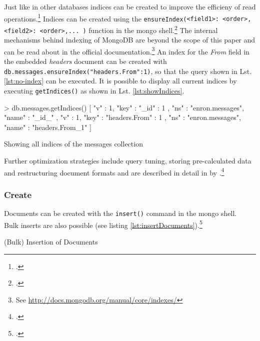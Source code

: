 Just like in other databases indices can be created to improve the efficieny of
read operations.\footcite[Cf.][152 et sq.]{Redmond_2012} Indices can be created
using the \texttt{ensureIndex({<field1>: <order>, <field2>: <order>,... })}
function in the mongo shell.\footcite[Cf.][12]{mongo_crud_manual} 
The internal mechanisms behind indexing of MongoDB are beyond the scope of this
paper and can be read about in the official documentation.\footnote{See
\url{http://docs.mongodb.org/manual/core/indexes/}} An index for the
\textit{From} field in the embedded \textit{headers} document can be created
with \texttt{db.messages.ensureIndex({"headers.From":1})}, so that the query
shown in Lst. \ref{lst:no-index} can be executed. It is possible to display all
current indices by executing \texttt{getIndices()} as shown in Lst.
\ref{lst:showIndices}.

\begin{listing}
    \begin{javascriptcode}
> db.messages.getIndices()
[   {
        "v" : 1,
        "key" : { "_id" : 1 },
        "ns" : "enron.messages",
        "name" : "_id_"
    },
    {
        "v" : 1,
        "key" : { "headers.From" : 1 },
        "ns" : "enron.messages",
        "name" : "headers.From_1"
    } ]
    \end{javascriptcode}
    \caption{Showing all indices of the messages collection}
    \label{lst:showIndices}
\end{listing}

Further optimization strategies include query tuning, storing pre-calculated
data and restructuring document formats and are described in detail in
 by
\citeauthor{Chodorow_2011_tips}.\footcite[Cf.][]{Chodorow_2011_tips}

\FloatBarrier
\subsubsection{Create}
Documents can be created with the \texttt{insert()} command in the mongo
shell.\\
Bulk inserts are also possible (see listing \ref{lst:insertDocuments}).\footcite[Cf.][p. 53 et sqq.]{mongo_crud_manual}

\begin{code}
    \caption{(Bulk) Insertion of Documents}
    \label{lst:insertDocuments}
\end{code}

\FloatBarrier
\pagebreak

